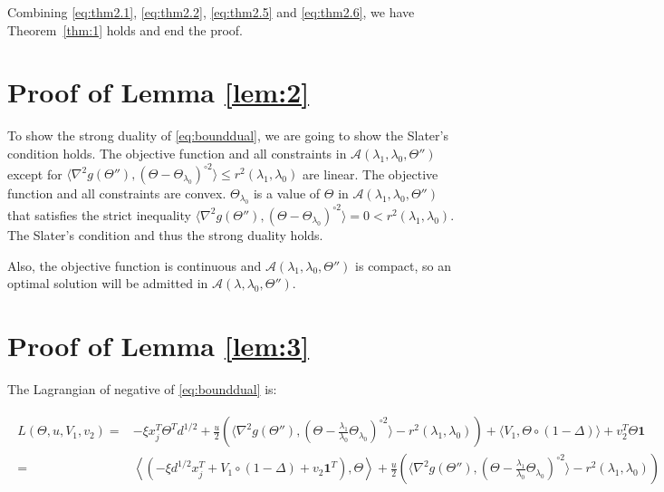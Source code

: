 Combining \eqref{eq:thm2.1}, \eqref{eq:thm2.2}, \eqref{eq:thm2.5} and \eqref{eq:thm2.6}, we have Theorem~\ref{thm:1} holds and end the proof.

\hspace{0 in}

\section{Proof of Lemma \ref{lem:2}}

To show the strong duality of \eqref{eq:bounddual}, we are going to show the Slater's condition holds. The objective function and all constraints in $\mathcal{A}(\lambda_1,{\lambda_0},\Theta'')$ except for $\langle\nabla^2 g(\Theta''),(\Theta-\Theta_{\lambda_0})^{\circ 2}\rangle\leq r^2(\lambda_1,\lambda_0)$ are linear. The objective function and all constraints are convex. $\Theta_{\lambda_0}$ is a value of $\Theta$ in $\mathcal{A}(\lambda_1,{\lambda_0},\Theta'')$ that satisfies the strict inequality $\langle\nabla^2 g(\Theta''),(\Theta-\Theta_{\lambda_0})^{\circ 2}\rangle=0< r^2(\lambda_1,\lambda_0)$. The Slater's condition and thus the strong duality holds.

Also, the objective function is continuous and $\mathcal{A}(\lambda_1,{\lambda_0},\Theta'')$ is compact, so an optimal solution will be admitted in $\mathcal{A}(\lambda,{\lambda_0},\Theta'')$.


\section{Proof of Lemma \ref{lem:3}}

The Lagrangian of negative of \eqref{eq:bounddual} is:

\begin{gather}
    \label{eq:lem4.1}
    \begin{aligned}
        L(\Theta,u,V_1,v_2)=&-\xi x_j^T\Theta^T d^{1/2}+\frac{u}{2}\left(\langle\nabla^2 g(\Theta''),(\Theta-\frac{\lambda_1}{\lambda_0}\Theta_{\lambda_0})^{\circ 2}\rangle-r^2(\lambda_1,\lambda_0)\right)
        +\langle V_1,\Theta\circ(1-\Delta)\rangle+v_2^T\Theta\mathbf{1}\\
        =&\left\langle\left(-\xi d^{1/2}x_j^T+V_1\circ(1-\Delta)+v_2\mathbf{1}^T\right),\Theta\right\rangle+\frac{u}{2}\left(\langle\nabla^2 g(\Theta''),(\Theta-\frac{\lambda_1}{\lambda_0}\Theta_{\lambda_0})^{\circ 2}\rangle-r^2(\lambda_1,\lambda_0)\right)
    \end{aligned}
\end{gather}

